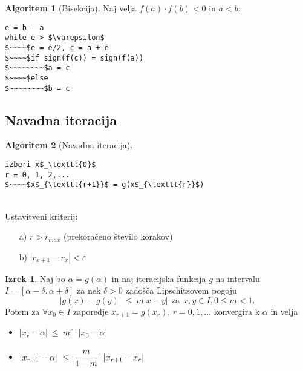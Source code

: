 \documentclass[11pt]{article}
\theoremstyle{definition}
\newtheorem{izrek}{Izrek}
\newtheorem*{algoritem}{Algoritem}
\begin{document}
\begin{algoritem}[Bisekcija]

Naj velja $f(a) \cdot f(b) < 0$ in $a < b$:
\begin{lstlisting}
e = b - a
while e > $\varepsilon$
$~~~~$e = e/2, c = a + e
$~~~~$if sign(f(c)) = sign(f(a))
$~~~~~~~~$a = c
$~~~~$else
$~~~~~~~~$b = c
\end{lstlisting}
\end{algoritem}
\vspace{0.5cm}


\subsection{Navadna iteracija}
\vspace{0.5cm}

\begin{algoritem}[Navadna iteracija]
~\\
\begin{lstlisting}
izberi x$_\texttt{0}$
r = 0, 1, 2,...
$~~~~$x$_{\texttt{r+1}}$ = g(x$_{\texttt{r}}$)
\end{lstlisting}
~\\
Ustavitveni kriterij:
\begin{enumerate}
	\item[a)] $r > r_{max}$ (prekoračeno število korakov)
	\item[b)] $|r_{x+1} - r_x| < \varepsilon$
\end{enumerate}
\end{algoritem}
\vspace{0.5cm}

\begin{izrek}

Naj bo $\alpha = g(\alpha)$ in naj iteracijska  funkcija $g$ na intervalu $I = [\alpha - \delta, \alpha + \delta]$ za nek $\delta > 0$ zadošča Lipschitzovem pogoju
$$|g(x) - g(y)| ~\leq~ m|x - y| ~~\text{za}~~ x, y \in I, 0 \leq m < 1.$$
Potem za $\forall x_0 \in I$ zaporedje $x_{r+1} = g(x_r)$, $r = 0, 1, \ldots$ konvergira k $\alpha$ in velja
\begin{itemize}
	\item $|x_r - \alpha| ~\leq~ m^r \cdot |x_0 - \alpha|$
	\item $|x_{r+1} - \alpha| ~\leq~ \cfrac{m}{1-m} \cdot |x_{r+1} - x_r|$
\end{itemize}

\end{izrek}
\vspace{0.5cm}
\end{document}
